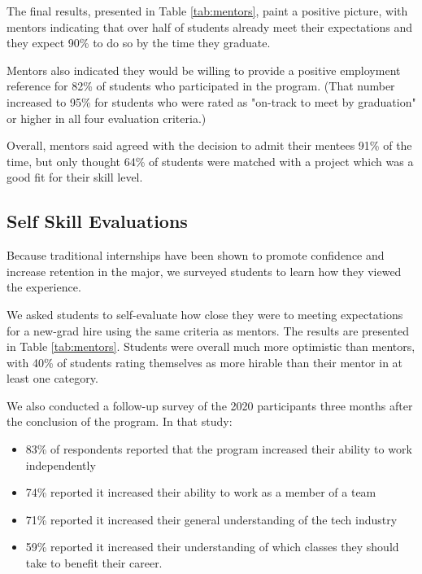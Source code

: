 The final results, presented in Table \ref{tab:mentors}, paint a positive picture, with mentors indicating that over half of students already meet their expectations and they expect 90\% to do so by the time they graduate.

Mentors also indicated they would be willing to provide a positive employment reference for 82\% of students who participated in the program. (That number increased to 95\% for students who were rated as "on-track to meet by graduation" or higher in all four evaluation criteria.)



Overall, mentors said agreed with the decision to admit their mentees 91\% of the time, but only thought 64\% of students were matched with a project which was a good fit for their skill level.

\subsection{Self Skill Evaluations}

Because traditional internships have been shown to promote confidence and increase retention in the major, we surveyed students to learn how they viewed the experience.

We asked students to self-evaluate how close they were to meeting expectations for a new-grad hire using the same criteria as mentors. The results are presented in Table \ref{tab:mentors}. Students were overall much more optimistic than mentors, with 40\% of students rating themselves as more hirable than their mentor in at least one category.



We also conducted a follow-up survey of the 2020 participants three months after the conclusion of the program. In that study:

\begin{itemize}
    \item 83\% of respondents reported that the program increased their ability to work independently
    \item 74\% reported it increased their ability to work as a member of a team
    \item 71\% reported it increased their general understanding of the tech industry
    \item 59\% reported it increased their understanding of which classes they should take to benefit their career.
\end{itemize}